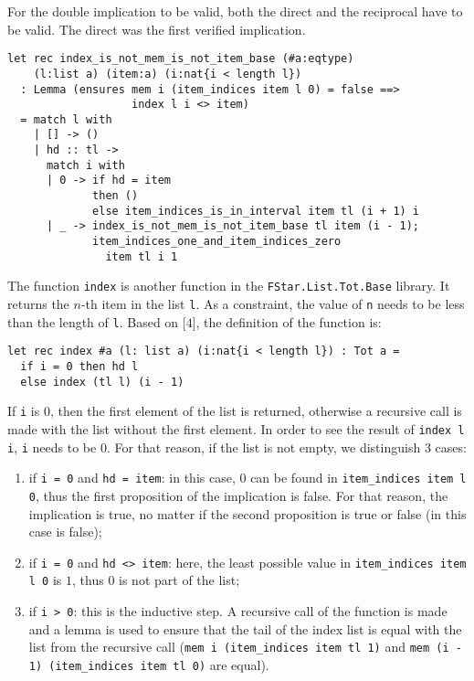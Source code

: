 For the double implication to be valid, both the direct and the reciprocal have to be valid. The direct was the first verified implication.

\begin{verbatim}
let rec index_is_not_mem_is_not_item_base (#a:eqtype) 
    (l:list a) (item:a) (i:nat{i < length l})
  : Lemma (ensures mem i (item_indices item l 0) = false ==>
                   index l i <> item)
  = match l with  
    | [] -> ()
    | hd :: tl -> 
      match i with  
      | 0 -> if hd = item 
             then ()
             else item_indices_is_in_interval item tl (i + 1) i
      | _ -> index_is_not_mem_is_not_item_base tl item (i - 1);
             item_indices_one_and_item_indices_zero 
               item tl i 1
\end{verbatim}

The function \texttt{index} is another function in the \texttt{FStar.List.Tot.Base} library. It returns the \(n\)-th item in the list \texttt{l}. As a constraint, the value of \texttt{n} needs to be less than the length of \texttt{l}. Based on [\(4\)], the definition of the function is:

\begin{verbatim}
let rec index #a (l: list a) (i:nat{i < length l}) : Tot a =
  if i = 0 then hd l 
  else index (tl l) (i - 1)
\end{verbatim}

If \texttt{i} is \(0\), then the first element of the list is returned, otherwise a recursive call is made with the list without the first element. In order to see the result of \texttt{index l i}, \texttt{i} needs to be \(0\). For that reason, if the list is not empty, we distinguish \(3\) cases: 
\begin{enumerate}
\item if \texttt{i = 0} and \texttt{hd = item}: in this case, \(0\) can be found in \texttt{item\_indices item l 0}, thus the first proposition of the implication is false. For that reason, the implication is true, no matter if the second proposition is true or false (in this case is false);
\item if \texttt{i = 0} and \texttt{hd <> item}: here, the least possible value in \texttt{item\_indices item l 0} is \(1\), thus \(0\) is not part of the list;
\item if \texttt{i > 0}: this is the inductive step. A recursive call of the function is made and a lemma is used to ensure that the tail of the index list is equal with the list from the recursive call (\texttt{mem i (item\_indices item tl 1)} and \texttt{mem (i - 1) (item\_indices item tl 0)} are equal).
\end{enumerate}

